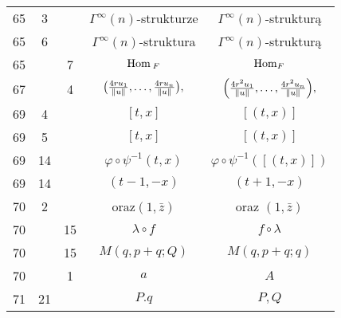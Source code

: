\documentclass[a4paper,11pt]{article}
\begin{document}
\begin{center}
\begin{tabular}{|c|c|c|c|c|}
    65  &  3 & & $\Gamma^{ \infty }( n )$-strukturze
           & $\Gamma^{ \infty }( n )$-strukturą \\
    65  &  6 & & $\Gamma^{ \infty }( n )$-struktura
           & $\Gamma^{ \infty }( n )$-strukturą \\
    65  & &  7 & $\mathrm{Hom}_{ \: F }$ & $\mathrm{Hom}_{ F }$ \\
    67  & &  4 & $\big( \frac{ 4 r u_{ 1 } }{ \lVert{  u  }\rVert }, \ldots,
                 \frac{ 4 r u_{ n } }{ \lVert{  u  }\rVert } \big),$
           & $\left( \frac{ 4 r^{ 2 } u_{ 1 } }{ \lVert{  u  }\rVert }, \ldots,
             \frac{ 4 r^{ 2 } u_{ n } }{ \lVert{  u  }\rVert } \right)\! ,$ \\
    69  &  4 & & $[ t, x ]$ & $[ ( t, x ) ]$ \\
    69  &  5 & & $[ t, x ]$ & $[ ( t, x ) ]$ \\
    69  & 14 & & $\varphi \circ \psi^{ -1 }( t, x )$
           & $\varphi \circ \psi^{ -1 }( [ ( t, x ) ] )$ \\
    69  & 14 & & $( t - 1, -x )$ & $( t + 1, -x )$ \\
    70  &  2 & & oraz$( 1, \bar{ z } )$ & oraz $( 1, \bar{ z } )$ \\
    70  & & 15 & $\lambda \circ f$ & $f \circ \lambda$ \\
    70  & & 15 & $M( q, p + q; Q )$ & $M( q, p + q; q )$ \\
    70  & &  1 & $a$ & $A$ \\
    71  & 21 & & $P.q$ & $P, Q$ \\
    \hline
  \end{tabular}






\end{center}
\end{document}
